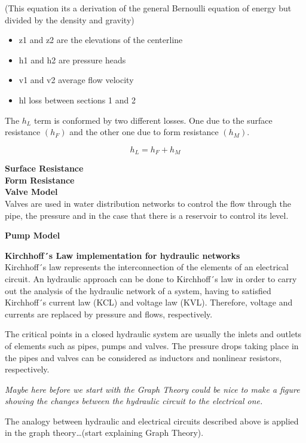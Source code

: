 (This equation its a derivation of the general Bernoulli equation of energy but divided by the density and 
gravity)\\

\begin{itemize}
  \item   z1 and z2 are the elevations of the centerline
  \item   h1 and h2 are pressure heads
  \item   v1 and v2 average flow velocity
  \item   hl loss between sections 1 and 2
\end{itemize}

The $h_L$ term is conformed by two different losses. One due to the surface resistance $(h_F)$ and the other one due to form resistance $(h_M)$. 

\begin{equation}
  h_L = h_F + h_M
\end{equation}

\textbf{Surface Resistance} \\ 

\textbf{Form Resistance} \\ 

\textbf{Valve Model}  \\
\label{ValveModel}
 Valves are used in water distribution networks to control the flow through the pipe, the pressure and in 
 the case that there is a reservoir to control its level. 
 
 \textbf{Pump Model} \\
 \label{PumpModel}
 
 \textbf{Kirchhoff´s Law implementation for hydraulic networks}\\
 \label{KirchhoffLaw}
 Kirchhoff´s law represents the interconnection of the elements of an electrical circuit. An hydraulic approach 
 can be done to Kirchhoff´s law in order to carry out the analysis of the hydraulic network of a system, having to satisfied Kirchhoff´s 
 current law (KCL) and voltage law (KVL). Therefore, voltage and currents are replaced by pressure and flows, respectively. 

The critical points in a closed hydraulic system are usually the inlets and outlets of elements such as pipes, pumps and valves. 
The pressure drops taking place in the pipes and valves can be considered as inductors and nonlinear resistors, respectively. 

\textit{Maybe here before we start with the Graph Theory could be nice to make a figure showing the changes between the hydraulic circuit to the electrical 
one.}

The analogy between hydraulic and electrical circuits described above is applied in the graph theory…(start explaining Graph Theory).






